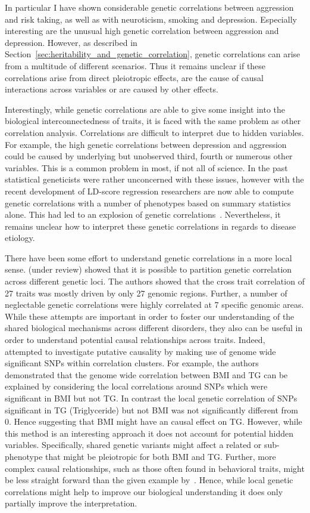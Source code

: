 In particular I have shown considerable genetic correlations between aggression and risk taking, as well as with neuroticism, smoking and depression. 
Especially interesting are the unusual high genetic correlation between aggression and depression.
However, as described in Section~\ref{sec:heritability_and_genetic_correlation}, genetic correlations can arise from a multitude of different scenarios.
Thus it remains unclear if these correlations arise from direct pleiotropic effects, are the cause of causal interactions across variables or are caused by other effects. 

Interestingly, while genetic correlations are able to give some insight into the biological interconnectedness of traits, it is faced with the same problem as other correlation analysis. 
Correlations are difficult to interpret due to hidden variables.
For example, the high genetic correlations between depression and aggression could be caused by underlying but unobserved third, fourth or numerous other variables.
This is a common problem in most, if not all of science.
In the past statistical geneticists were rather unconcerned with these issues, however with the recent development of LD-score regression researchers are now able to compute genetic correlations with a number of phenotypes based on summary statistics alone.
This had led to an explosion of genetic correlations~\cite{Bulik-Sullivan2015b,Bulik-Sullivan2015a}.
Nevertheless, it remains unclear how to interpret these genetic correlations in regards to disease etiology.

There have been some effort to understand genetic correlations in a more local sense.
\citet{Shi2016a} (under review) showed that it is possible to partition genetic correlation across different genetic loci.
The authors showed that the cross trait correlation of 27 traits was mostly driven by only 27 genomic regions. 
Further, a number of neglectable genetic correlations were highly correlated at 7 specific genomic areas.
While these attempts are important in order to foster our understanding of the shared biological mechanisms across different disorders, they also can be useful in order to understand potential causal relationships across traits.
Indeed,~\citet{Shi2016a} attempted to investigate putative causality by making use of genome wide significant SNPs within correlation clusters.
For example, the authors demonstrated that the genome wide correlation between BMI and TG can be explained by considering the local correlations around SNPs which were significant in BMI but not TG\@.
In contrast the local genetic correlation of SNPs significant in TG (Triglyceride) but not BMI was not significantly different from $0$.
Hence suggesting that BMI might have an causal effect on TG\@.
However, while this method is an interesting approach it does not account for potential hidden variables.
Specifically, shared genetic variants might affect a related or sub-phenotype that might be pleiotropic for both BMI and TG\@.
Further, more complex causal relationships, such as those often found in behavioral traits, might be less straight forward than the given example by~\citet{Shi2016a}.
Hence, while local genetic correlations might help to improve our biological understanding it does only partially improve the interpretation.

